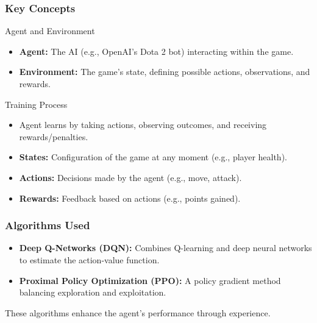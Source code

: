 \documentclass[aspectratio=169]{beamer}
\begin{document}
\begin{frame}[fragile]
    \frametitle{Key Concepts}

    \begin{block}{Agent and Environment}
        \begin{itemize}
            \item \textbf{Agent:} The AI (e.g., OpenAI's Dota 2 bot) interacting within the game.
            \item \textbf{Environment:} The game's state, defining possible actions, observations, and rewards.
        \end{itemize}
    \end{block}

    \begin{block}{Training Process}
        \begin{itemize}
            \item Agent learns by taking actions, observing outcomes, and receiving rewards/penalties.
            \item \textbf{States:} Configuration of the game at any moment (e.g., player health).
            \item \textbf{Actions:} Decisions made by the agent (e.g., move, attack).
            \item \textbf{Rewards:} Feedback based on actions (e.g., points gained).
        \end{itemize}
    \end{block}
    
\end{frame}

\begin{frame}[fragile]
    \frametitle{Algorithms Used}

    \begin{itemize}
        \item \textbf{Deep Q-Networks (DQN):} Combines Q-learning and deep neural networks to estimate the action-value function.
        \item \textbf{Proximal Policy Optimization (PPO):} A policy gradient method balancing exploration and exploitation.
    \end{itemize}
    
    These algorithms enhance the agent’s performance through experience.
    
\end{frame}
\end{document}
